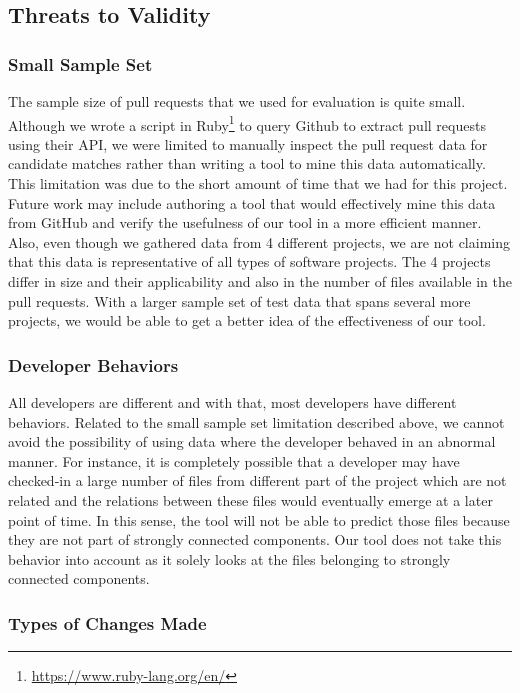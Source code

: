 \subsection{Threats to Validity}
\label{sec:threats}

\subsubsection{Small Sample Set}

The sample size of pull requests that we used for evaluation is quite small. Although we wrote a script in Ruby\footnote{\url{https://www.ruby-lang.org/en/}} to query Github to extract pull requests using their API, we were limited to manually inspect the pull request data for candidate matches rather than writing a tool to mine this data automatically. This limitation was due to the short amount of time that we had for this project. Future work may include authoring a tool that would effectively mine this data from GitHub and verify the usefulness of our tool in a more efficient manner. Also, even though we gathered data from 4 different projects, we are not claiming that this data is representative of all types of software projects. The 4 projects differ in size and their applicability and also in the number of files available in the pull requests. With a larger sample set of test data that spans several more projects, we would be able to get a better idea of the effectiveness of our tool.

\subsubsection{Developer Behaviors}

All developers are different and with that, most developers have different behaviors. Related to the small sample set limitation described above, we cannot avoid the possibility of using data where the developer behaved in an abnormal manner. For instance, it is completely possible that a developer may have checked-in a large number of files from different part of the project which are not related and the relations between these files would eventually emerge at a later point of time. In this sense, the tool will not be able to predict those files because they are not part of strongly connected components. Our tool does not take this behavior into account as it solely looks at the files belonging to strongly connected components.

\subsubsection{Types of Changes Made}

